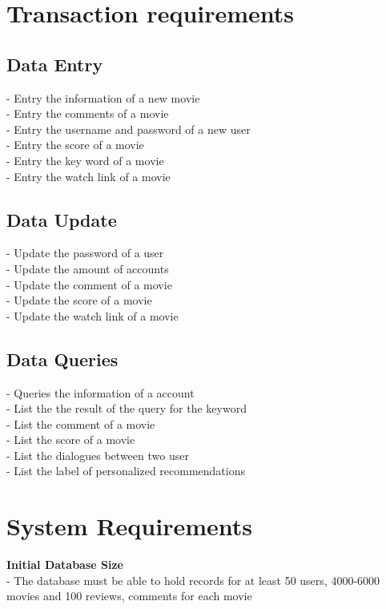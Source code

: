 \documentclass[10pt]{article}
\begin{document}
\section{Transaction requirements}
\subsection{Data Entry}
\begin{multicols}{2}
\noindent 
- Entry the information of a new movie\\
- Entry the comments of a movie\\
- Entry the username and password of a new user\\
- Entry the score of a movie\\
- Entry the key word of a movie\\
- Entry the watch link of a movie\\
\end{multicols}
\subsection{Data Update}
\begin{multicols}{2}
\noindent
- Update the password of a user\\
- Update the amount of accounts\\
- Update the comment of a movie\\
- Update the score of a movie\\
- Update the watch link of a movie
\end{multicols}
\subsection{Data Queries}
\begin{multicols}{2}
\noindent
- Queries the information of a account\\
- List the the result of the query for the keyword\\
- List the comment of a movie\\
- List the score of a movie\\
- List the dialogues between two user\\
- List the label of personalized recommendations\\
\end{multicols}


\section{System Requirements}
\noindent
\textbf{Initial Database Size\\}
- The database must be able to hold records for at least 50 users, 4000-6000 movies and 100 reviews, comments for each movie
\end{document}
